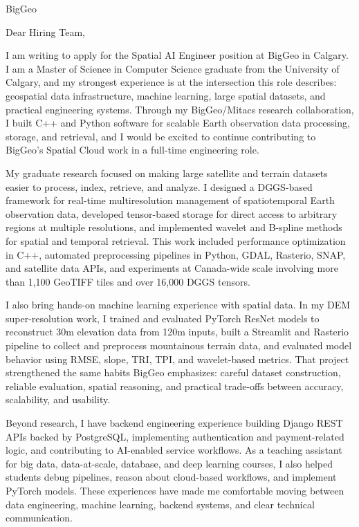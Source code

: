 \documentclass[11pt]{letter}
\begin{document}
\begin{letter}{BigGeo}

\opening{Dear Hiring Team,}

I am writing to apply for the Spatial AI Engineer position at BigGeo in Calgary. I am a Master of Science in Computer Science graduate from the University of Calgary, and my strongest experience is at the intersection this role describes: geospatial data infrastructure, machine learning, large spatial datasets, and practical engineering systems. Through my BigGeo/Mitacs research collaboration, I built C++ and Python software for scalable Earth observation data processing, storage, and retrieval, and I would be excited to continue contributing to BigGeo's Spatial Cloud work in a full-time engineering role.

My graduate research focused on making large satellite and terrain datasets easier to process, index, retrieve, and analyze. I designed a DGGS-based framework for real-time multiresolution management of spatiotemporal Earth observation data, developed tensor-based storage for direct access to arbitrary regions at multiple resolutions, and implemented wavelet and B-spline methods for spatial and temporal retrieval. This work included performance optimization in C++, automated preprocessing pipelines in Python, GDAL, Rasterio, SNAP, and satellite data APIs, and experiments at Canada-wide scale involving more than 1,100 GeoTIFF tiles and over 16,000 DGGS tensors.

I also bring hands-on machine learning experience with spatial data. In my DEM super-resolution work, I trained and evaluated PyTorch ResNet models to reconstruct 30m elevation data from 120m inputs, built a Streamlit and Rasterio pipeline to collect and preprocess mountainous terrain data, and evaluated model behavior using RMSE, slope, TRI, TPI, and wavelet-based metrics. That project strengthened the same habits BigGeo emphasizes: careful dataset construction, reliable evaluation, spatial reasoning, and practical trade-offs between accuracy, scalability, and usability.

Beyond research, I have backend engineering experience building Django REST APIs backed by PostgreSQL, implementing authentication and payment-related logic, and contributing to AI-enabled service workflows. As a teaching assistant for big data, data-at-scale, database, and deep learning courses, I also helped students debug pipelines, reason about cloud-based workflows, and implement PyTorch models. These experiences have made me comfortable moving between data engineering, machine learning, backend systems, and clear technical communication.


\end{letter}
\end{document}
